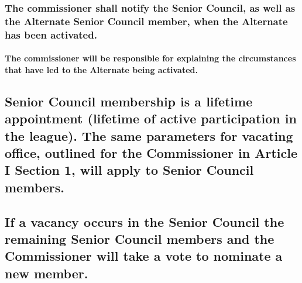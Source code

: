 \documentclass[
]{book}
\begin{document}
\hypertarget{the-commissioner-shall-notify-the-senior-council-as-well-as-the-alternate-senior-council-member-when-the-alternate-has-been-activated.}{%
\subsubsection{The commissioner shall notify the Senior Council, as well as the Alternate Senior Council member, when the Alternate has been activated.}\label{the-commissioner-shall-notify-the-senior-council-as-well-as-the-alternate-senior-council-member-when-the-alternate-has-been-activated.}}

\hypertarget{the-commissioner-will-be-responsible-for-explaining-the-circumstances-that-have-led-to-the-alternate-being-activated.}{%
\paragraph{The commissioner will be responsible for explaining the circumstances that have led to the Alternate being activated.}\label{the-commissioner-will-be-responsible-for-explaining-the-circumstances-that-have-led-to-the-alternate-being-activated.}}

\hypertarget{senior-council-membership-is-a-lifetime-appointment-lifetime-of-active-participation-in-the-league.-the-same-parameters-for-vacating-office-outlined-for-the-commissioner-in-article-i-section-1-will-apply-to-senior-council-members.}{%
\subsection{Senior Council membership is a lifetime appointment (lifetime of active participation in the league). The same parameters for vacating office, outlined for the Commissioner in Article I Section 1, will apply to Senior Council members.}\label{senior-council-membership-is-a-lifetime-appointment-lifetime-of-active-participation-in-the-league.-the-same-parameters-for-vacating-office-outlined-for-the-commissioner-in-article-i-section-1-will-apply-to-senior-council-members.}}

\hypertarget{if-a-vacancy-occurs-in-the-senior-council-the-remaining-senior-council-members-and-the-commissioner-will-take-a-vote-to-nominate-a-new-member.}{%
\subsection{If a vacancy occurs in the Senior Council the remaining Senior Council members and the Commissioner will take a vote to nominate a new member.}\label{if-a-vacancy-occurs-in-the-senior-council-the-remaining-senior-council-members-and-the-commissioner-will-take-a-vote-to-nominate-a-new-member.}}
\end{document}
